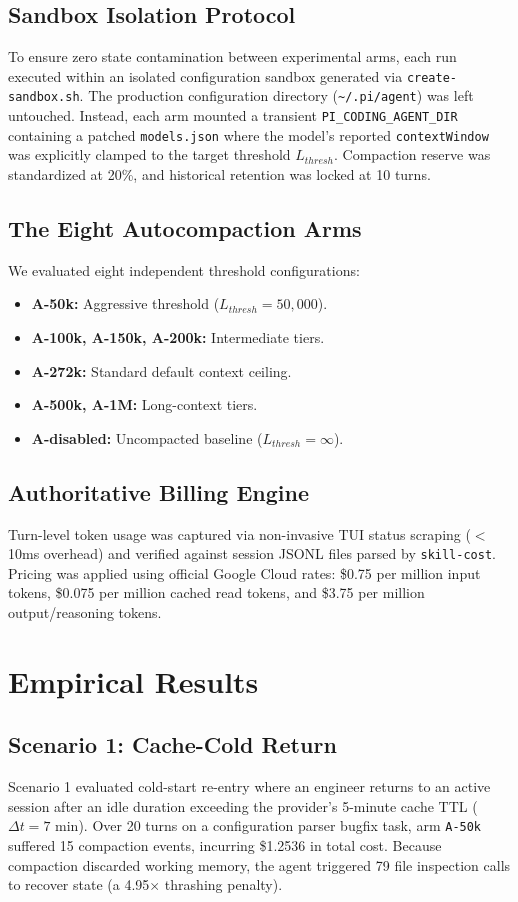 \documentclass[10pt,twocolumn,a4paper]{article}
\begin{document}
\subsection{Sandbox Isolation Protocol}
To ensure zero state contamination between experimental arms, each run executed within an isolated configuration sandbox generated via \texttt{create-sandbox.sh}. The production configuration directory (\texttt{\~{}/.pi/agent}) was left untouched. Instead, each arm mounted a transient \texttt{PI\_CODING\_AGENT\_DIR} containing a patched \texttt{models.json} where the model's reported \texttt{contextWindow} was explicitly clamped to the target threshold $L_{thresh}$. Compaction reserve was standardized at 20\%, and historical retention was locked at 10 turns.

\subsection{The Eight Autocompaction Arms}
We evaluated eight independent threshold configurations:
\begin{itemize}
  \item \textbf{A-50k:} Aggressive threshold ($L_{thresh} = 50,000$).
  \item \textbf{A-100k, A-150k, A-200k:} Intermediate tiers.
  \item \textbf{A-272k:} Standard default context ceiling.
  \item \textbf{A-500k, A-1M:} Long-context tiers.
  \item \textbf{A-disabled:} Uncompacted baseline ($L_{thresh} = \infty$).
\end{itemize}

\subsection{Authoritative Billing Engine}
Turn-level token usage was captured via non-invasive TUI status scraping ($<$10ms overhead) and verified against session JSONL files parsed by \texttt{skill-cost}. Pricing was applied using official Google Cloud rates: \$0.75 per million input tokens, \$0.075 per million cached read tokens, and \$3.75 per million output/reasoning tokens.

\section{Empirical Results}

\subsection{Scenario 1: Cache-Cold Return}
Scenario 1 evaluated cold-start re-entry where an engineer returns to an active session after an idle duration exceeding the provider's 5-minute cache TTL ($\Delta t = 7\text{ min}$). Over 20 turns on a configuration parser bugfix task, arm \texttt{A-50k} suffered 15 compaction events, incurring \$1.2536 in total cost. Because compaction discarded working memory, the agent triggered 79 file inspection calls to recover state (a 4.95$\times$ thrashing penalty).
\end{document}
